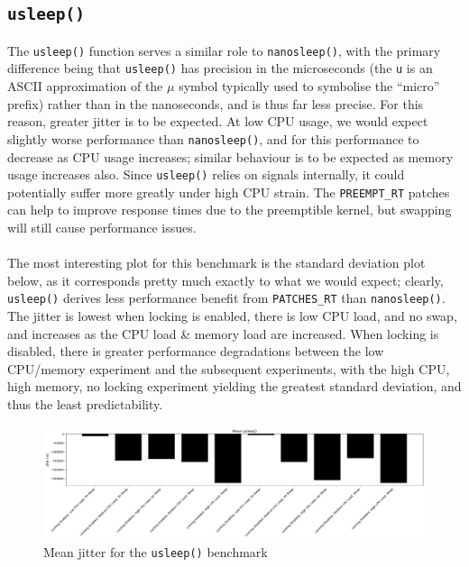 \documentclass[a4paper]{article}
\begin{document}
\subsection{\texttt{usleep()}}
The \texttt{usleep()} function serves a similar role to \texttt{nanosleep()}, with the primary difference being that \texttt{usleep()} has precision in the microseconds (the \verb|u| is an ASCII approximation of the $\mu$ symbol typically used to symbolise the ``micro'' prefix) rather than in the nanoseconds, and is thus far less precise.
For this reason, greater jitter is to be expected.
At low CPU usage, we would expect slightly worse performance than \texttt{nanosleep()}, and for this performance to decrease as CPU usage increases;
similar behaviour is to be expected as memory usage increases also.
Since \texttt{usleep()} relies on signals internally, it could potentially suffer more greatly under high CPU strain.  
The \verb|PREEMPT_RT| patches can help to improve response times due to the preemptible kernel, but swapping will still cause performance issues.
\\\\
The most interesting plot for this benchmark is the standard deviation plot below, as it corresponds pretty much exactly to what we would expect; clearly, \texttt{usleep()} derives less performance benefit from \verb|PATCHES_RT| than \texttt{nanosleep()}.
The jitter is lowest when locking is enabled, there is low CPU load, and no swap, and increases as the CPU load \& memory load are increased.
When locking is disabled, there is greater performance degradations between the low CPU/memory experiment and the subsequent experiments, with the high CPU, high memory, no locking experiment yielding the greatest standard deviation, and thus the least predictability.

\begin{figure}[H]
    \centering
    \includegraphics[width=\textwidth]{./images/usleep-mean.png}
    \caption{Mean jitter for the \texttt{usleep()} benchmark}
\end{figure}
\end{document}
